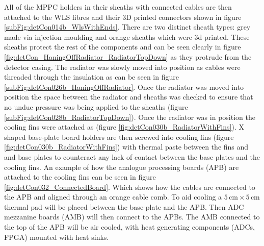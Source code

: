 
All of the MPPC holders in their sheaths with connected cables are then attached to the WLS fibres and their 3D printed connectors shown in figure \ref{subFig:detCon014b_WlsWithEnds}. There are two distinct sheath types: grey made via injection moulding and orange sheaths which were 3d printed. These sheaths protect the rest of the components and can be seen clearly in figure \ref{fig:detCon_HaningOffRadiator_RadiatorTopDown} as they protrude from the detector casing. The radiator was slowly moved into position as cables were threaded through the insulation as can be seen in figure \ref{subFig:detCon026b_HaningOffRadiator}. Once the radiator was moved into position the space between the radiator and sheaths was checked to ensure that no undue pressure was being applied to the sheaths (figure \ref{subFig:detCon028b_RadiatorTopDown}). Once the radiator was in position the cooling fins were  attached as (figure \ref{fig:detCon030b_RadiatorWithFins}). X shaped base-plate board holders are then screwed into cooling fins (figure \ref{fig:detCon030b_RadiatorWithFins}) with thermal paste between the fins and and base plates to counteract any lack of contact between the base plates and the cooling fins. An example of how the analogue processing boards (APB) are attached to the cooling fins can be seen in figure \ref{fig:detCon032_ConnectedBoard}. Which shows how the cables are connected to the APB and aligned through an orange cable comb. To aid cooling a $5\,\textrm{cm}\times5\,\textrm{cm}$ thermal pad will be placed between the base-plate and the APB. Then ADC mezzanine boards (AMB) will then connect to the APBs. The AMB connected to the top of the APB will be air cooled, with heat generating components (ADCs, FPGA) mounted with heat sinks.

